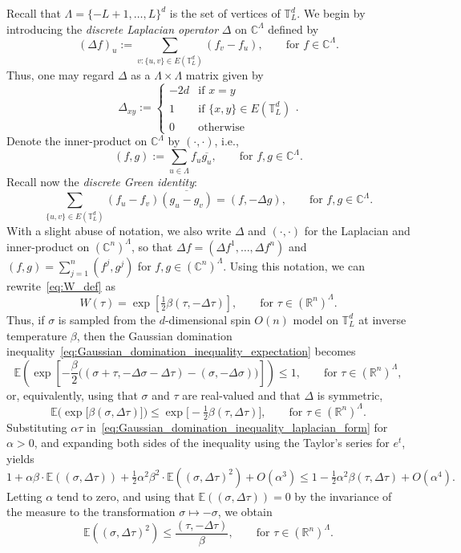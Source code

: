 \documentclass[12pt,reqno]{article}
\def\R{\mathbb{R}}
\def\C{\mathbb{C}}
\def\E{\mathbb{E}}
\def\T{\mathbb{T}}
\begin{document}
Recall that $\Lambda = \{-L+1,\dots,L\}^d$ is the set of vertices of $\T_L^d$.
We begin by introducing the \emph{discrete Laplacian operator} $\Delta$ on $\C^\Lambda$ defined by
\[ (\Delta f)_u := \sum_{v\colon \{u,v\}\in E(\T_L^d)} (f_v - f_u), \qquad\text{for }f \in \C^\Lambda .\]
Thus, one may regard $\Delta$ as a $\Lambda \times \Lambda$ matrix given by
\[ \Delta_{xy} := \begin{cases} -2d &\text{if }x=y\\ 1 &\text{if }\{x,y\} \in E(\T_L^d) \\0 &\text{otherwise} \end{cases} .\]
Denote the inner-product on $\C^\Lambda$ by $(\cdot,\cdot)$, i.e.,
\[ (f,g) := \sum_{u \in \Lambda} f_u \overline{g_u} ,\qquad\text{for }f,g \in \C^\Lambda .\]
Recall now the \emph{discrete Green identity}:
\begin{equation*}
\sum_{\{u,v\}\in E(\T_L^d)} (f_u  - f_v) \overline{(g_u - g_v)} = (f, -\Delta g) ,\qquad\text{for }f,g \in \C^\Lambda.
\end{equation*}
With a slight abuse of notation, we also write $\Delta$ and $(\cdot,\cdot)$ for the Laplacian and inner-product on $(\C^n)^\Lambda$, so that $\Delta f = (\Delta f^1,\dots, \Delta f^n)$ and $(f,g) = \sum_{j=1}^n (f^j,g^j)$ for $f,g \in (\C^n)^\Lambda$.
Using this notation, we can rewrite~\eqref{eq:W_def} as
\[ W(\tau) = \exp\left[\tfrac{1}{2} \beta (\tau, -\Delta \tau) \right] , \qquad\text{for }\tau \in (\R^n)^\Lambda .\]
Thus, if $\sigma$ is sampled from the $d$-dimensional spin $O(n)$ model on $\T_L^d$ at inverse temperature $\beta$, then the Gaussian domination inequality~\eqref{eq:Gaussian_domination_inequality_expectation} becomes
\[ \E\left(\exp\left[-\frac{\beta}{2}\Big((\sigma+\tau, - \Delta\sigma-\Delta\tau) - (\sigma,-\Delta\sigma) \Big) \right]\right) \le 1 , \qquad\text{for }\tau \in (\R^n)^\Lambda, \]
or, equivalently, using that $\sigma$ and $\tau$ are real-valued and that $\Delta$ is symmetric,
\begin{equation}\label{eq:Gaussian_domination_inequality_laplacian_form}
\E\Big(\exp\big[\beta (\sigma, \Delta\tau)\big]\Big) \le \exp\Big[-\tfrac{1}{2} \beta (\tau,\Delta \tau) \Big] ,\qquad\text{for }\tau \in (\R^n)^\Lambda .
\end{equation}
Substituting $\alpha \tau$ in~\eqref{eq:Gaussian_domination_inequality_laplacian_form} for $\alpha>0$, and expanding both sides of the inequality using the Taylor's series for $e^t$, yields
\[ 1 + \alpha \beta \cdot \E\left((\sigma,\Delta\tau)\right) + \tfrac12 \alpha^2 \beta^2 \cdot \E\left((\sigma,\Delta\tau)^2\right) + O(\alpha^3) \le 1 - \tfrac12 \alpha^2 \beta (\tau,\Delta\tau) + O(\alpha^4) .\]
Letting $\alpha$ tend to zero, and using that $\E((\sigma,\Delta\tau))=0$ by the invariance of the measure to the transformation $\sigma \mapsto -\sigma$, we obtain
\begin{equation}\label{eq:Gaussian_domination_inequality_final_form}
\E\left((\sigma,\Delta\tau)^2\right) \le \frac{(\tau,-\Delta\tau)}{\beta} ,\qquad\text{for }\tau \in (\R^n)^\Lambda .
\end{equation}
\end{document}
